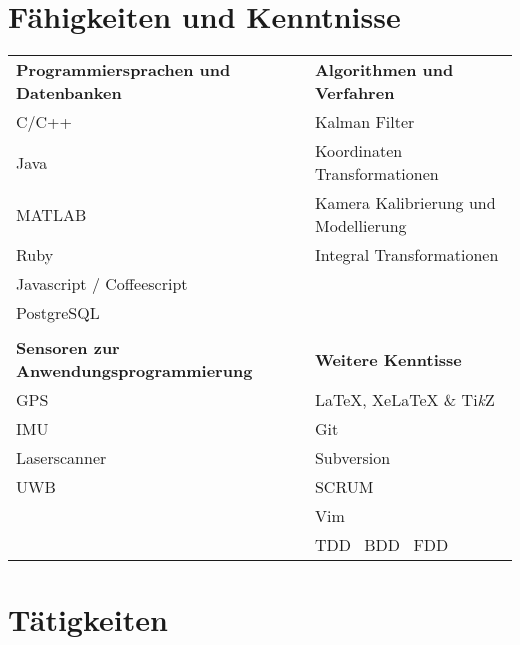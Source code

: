\documentclass[a4paper,10pt]{article} %
\begin{document}
 
\section{Fähigkeiten und Kenntnisse}
 
\begin{tabular}{ll}
\textbf{Programmiersprachen und Datenbanken}   & \textbf{Algorithmen und Verfahren}\\
C/C++                                 & Kalman Filter \\
Java                                  & Koordinaten Transformationen \\ 
MATLAB                                & Kamera Kalibrierung und Modellierung \\ 
Ruby                                  & Integral Transformationen  \\ 
Javascript / Coffeescript             & \\ 
PostgreSQL                            & \\ 
                                      & \\ 
\textbf{Sensoren zur Anwendungsprogrammierung} & \textbf{Weitere Kenntisse}\\
GPS                                   & LaTeX, XeLaTeX \& Ti\textit{k}Z\\ 
IMU                                   & Git \\ 
Laserscanner                          & Subversion \\ 
UWB                                   & SCRUM \\ 
                                      & Vim \\
                                      & TDD \ BDD \ FDD
\end{tabular}
 
 
\section{Tätigkeiten}
 
\end{document}
